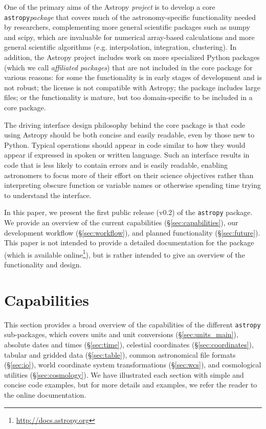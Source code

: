 \documentclass[traditabstract]{aa}
\newcommand{\astropy}{\texttt{astropy}\xspace}
\begin{document}
One of the primary aims of the Astropy \textit{project} is to develop a core
\astropy \textit{package} that covers much of the astronomy-specific
functionality needed by researchers, complementing more general scientific
packages such as \gls{numpy} and \gls{scipy}, which are invaluable for
numerical array-based calculations and more general scientific algorithms (e.g.
interpolation, integration, clustering). In addition, the Astropy project
includes work on more specialized Python packages (which we call
\textit{affiliated packages}) that are not included in the core package for
various reasons: for some the functionality is in early stages of development
and is not robust; the license is not compatible with Astropy; the package
includes large files; or the functionality is mature, but too domain-specific
to be included in a core package.

The driving interface design philosophy behind the core package is that code
using Astropy should be both concise and easily readable, even by those new to
Python. Typical operations should appear in code similar to how they would
appear if expressed in spoken or written language. Such an interface results in
code that is less likely to contain errors and is easily readable, enabling
astronomers to focus more of their effort on their science objectives rather
than interpreting obscure function or variable names or otherwise spending time
trying to understand the interface.

In this paper, we present the first public release (v0.2) of the \astropy
package. We provide an overview of the current capabilities
(\S\ref{sec:capabilities}), our development workflow (\S\ref{sec:workflow}),
and planned functionality (\S\ref{sec:future}). This paper is not intended to
provide a detailed documentation for the package (which is available
online\footnote{\url{http://docs.astropy.org}}), but is rather intended to give
an overview of the functionality and design.

\section{Capabilities}

This section provides a broad overview of the capabilities of the different
\astropy sub-packages, which covers units and unit conversions
(\S\ref{sec:units_main}), absolute dates and times (\S\ref{sec:time}),
celestial coordinates (\S\ref{sec:coordinates}), tabular and gridded data
(\S\ref{sec:table}), common astronomical file formats (\S\ref{sec:io}), world
coordinate system transformations (\S\ref{sec:wcs}), and cosmological utilities
(\S\ref{sec:cosmology}). We have illustrated each section with simple and
concise code examples, but for more details and examples, we refer the reader
to the online documentation\footnotemark[4].
\end{document}
